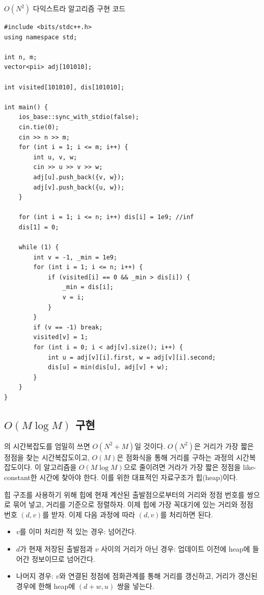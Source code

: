 \begin{code} \label{code: Dijkstra-naive}
$O(N^2)$ 다익스트라 알고리즘 구현 코드
\begin{lstlisting}
#include <bits/stdc++.h>
using namespace std;

int n, m;
vector<pii> adj[101010];

int visited[101010], dis[101010];

int main() {
    ios_base::sync_with_stdio(false);
    cin.tie(0);
    cin >> n >> m;
    for (int i = 1; i <= m; i++) {
        int u, v, w;
        cin >> u >> v >> w;
        adj[u].push_back({v, w});
        adj[v].push_back({u, w});
    }
    
    for (int i = 1; i <= n; i++) dis[i] = 1e9; //inf
    dis[1] = 0;
    
    while (1) {
        int v = -1, _min = 1e9;
        for (int i = 1; i <= n; i++) {
            if (visited[i] == 0 && _min > dis[i]) {
                _min = dis[i];
                v = i;
            }
        }
        if (v == -1) break;
        visited[v] = 1;
        for (int i = 0; i < adj[v].size(); i++) {
            int u = adj[v][i].first, w = adj[v][i].second;
            dis[u] = min(dis[u], adj[v] + w);
        }
    }
}
\end{lstlisting}
\end{code}

\subsection{$O(M \log M)$ 구현}
의 시간복잡도를 엄밀히 쓰면 $O(N^2+M)$일 것이다. $O(N^2)$은 거리가 가장 짧은 정점을 찾는 시간복잡도이고, $O(M)$은 점화식을 통해 거리를 구하는 과정의 시간복잡도이다.
이 알고리즘을 $O(M \log M)$으로 줄이려면 거라가 가장 짧은 정점을 like-constant한 시간에 찾아야 한다. 이를 위한 대표적인 자료구조가 힙(heap)이다.

힙 구조를 사용하기 위해 힙에 현재 계산된 출발점으로부터의 거리와 정점 번호를 쌍으로 묶어 넣고, 거리를 기준으로 정렬하자. 이제 힙에 가장 꼭대기에 있는 거리와 정점 번호 $(d, v)$를 받자. 이제 다음 과정에 따라 $(d, v)$를 처리하면 된다.

\begin{itemize}
    \item $v$를 이미 처리한 적 있는 경우: 넘어간다.
    \item $d$가 현재 저장된 출발점과 $v$ 사이의 거리가 아닌 경우: 업데이트 이전에 heap에 들어간 정보이므로 넘어간다.
    \item 나머지 경우: $v$와 연결된 정점에 점화관계를 통해 거리를 갱신하고, 거리가 갱신된 경우에 한해 heap에 $(d + w, u)$ 쌍을 넣는다.
\end{itemize}

